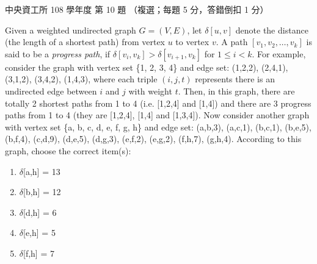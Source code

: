 \begin{pastexam}[label={px:ncu-108-dsa-10}]{中央資工所 108 學年度 第 10 題}
（複選；每題 5 分，答錯倒扣 1 分）

Given a weighted undirected graph $G = (V, E)$, let $\delta[u, v]$ denote the distance (the length
of a shortest path) from vertex $u$ to vertex $v$. A path $[v_1, v_2, \ldots, v_k]$ is said to be a
\textit{progress path}, if $\delta[v_i, v_k] > \delta[v_{i+1}, v_k]$ for $1 \le i < k$. For example,
consider the graph with vertex set \{1, 2, 3, 4\} and edge set: (1,2,2), (2,4,1), (3,1,2), (3,4,2),
(1,4,3), where each triple $(i, j, t)$ represents there is an undirected edge between $i$ and $j$
with weight $t$. Then, in this graph, there are totally 2 shortest paths from 1 to 4 (i.e. [1,2,4]
and [1,4]) and there are 3 progress paths from 1 to 4 (they are [1,2,4], [1,4] and [1,3,4]). Now
consider another graph with vertex set \{a, b, c, d, e, f, g, h\} and edge set: (a,b,3), (a,c,1),
(b,c,1), (b,e,5), (b,f,4), (c,d,9), (d,e,5), (d,g,3), (e,f,2), (e,g,2), (f,h,7), (g,h,4). According to this graph, choose the correct item(s):
\begin{enumerate}[label=(\Alph*)]
\item $\delta$[a,h] = 13
\item $\delta$[b,h] = 12
\item $\delta$[d,h] = 6
\item $\delta$[e,h] = 5
\item $\delta$[f,h] = 7
\end{enumerate}
\end{pastexam}

